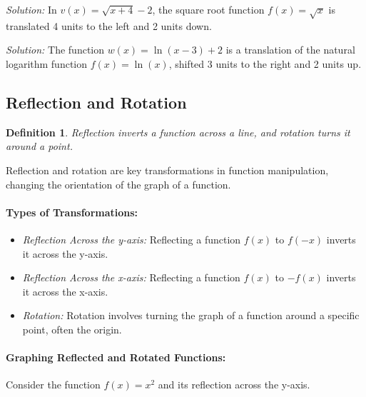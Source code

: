 \documentclass[a4paper,12pt]{book}
\newenvironment{solution}[1][]
{\par\noindent\textit{Solution:} \rmfamily}{\medskip}
\newtheorem{definition}{Definition}
\begin{document}
\begin{solution}[9]
In \( v(x) = \sqrt{x + 4} - 2 \), the square root function \( f(x) = \sqrt{x} \) is translated 4 units to the left and 2 units down.
\end{solution}

\begin{solution}[10]
The function \( w(x) = \ln(x - 3) + 2 \) is a translation of the natural logarithm function \( f(x) = \ln(x) \), shifted 3 units to the right and 2 units up.
\end{solution}

\subsection{Reflection and Rotation}
\begin{definition}
Reflection inverts a function across a line, and rotation turns it around a point.
\end{definition}

Reflection and rotation are key transformations in function manipulation, changing the orientation of the graph of a function.

\paragraph{Types of Transformations:}
\begin{itemize}
    \item \textit{Reflection Across the y-axis:} Reflecting a function \( f(x) \) to \( f(-x) \) inverts it across the y-axis.
    \item \textit{Reflection Across the x-axis:} Reflecting a function \( f(x) \) to \( -f(x) \) inverts it across the x-axis.
    \item \textit{Rotation:} Rotation involves turning the graph of a function around a specific point, often the origin.
\end{itemize}

\paragraph{Graphing Reflected and Rotated Functions:}
Consider the function \( f(x) = x^2 \) and its reflection across the y-axis.

\end{document}
